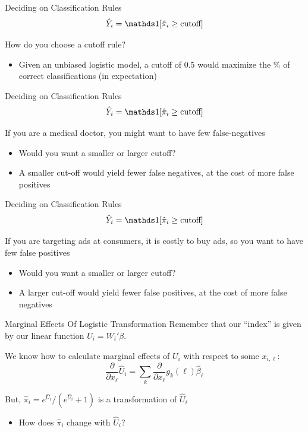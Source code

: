 \documentclass[aspectratio=169,t,11pt,table]{beamer}
\begin{document}
\begin{frame}{Deciding on Classification Rules}
  \vspace*{-\bigskipamount}
  $$\hat{Y}_i = \one{\hat{\pi}_i \geq \text{cutoff}}$$
  
  \bigskip
  How do you choose a cutoff rule?
  \begin{itemize}
    \item Given an unbiased logistic model, a cutoff of $0.5$ would maximize the \% of correct classifications (in expectation)
  \end{itemize}
\end{frame}

\begin{frame}{Deciding on Classification Rules}
  \vspace*{-\bigskipamount}
  $$\hat{Y}_i = \one{\hat{\pi}_i \geq \text{cutoff}}$$

  \bigskip
  If you are a medical doctor, you might want to have few false-negatives
  \begin{itemize}
    \item Would you want a smaller or larger cutoff?
    
    \pause
    \item A smaller cut-off would yield fewer false negatives, at the cost of more false positives
  \end{itemize}
\end{frame}

\begin{frame}{Deciding on Classification Rules}
  \vspace*{-\bigskipamount}
  $$\hat{Y}_i = \one{\hat{\pi}_i \geq \text{cutoff}}$$

  \bigskip
  If you are targeting ads at consumers, it is costly to buy ads, so you want to have few false positives
  \begin{itemize}
    \item Would you want a smaller or larger cutoff?
    
    \pause
    \item A larger cut-off would yield fewer false positives, at the cost of more false negatives
  \end{itemize}
\end{frame}

\begin{frame}{Marginal Effects Of Logistic Transformation}
  Remember that our ``index'' is given by our linear function $U_i = W_i' \beta$. 

  \bigskip
  We know how to calculate marginal effects of $U_i$ with respect to some $x_{i,\ell}$: 
  $$
    \frac{\partial}{\partial x_{\ell}} \hat{U}_i = \sum_k \frac{\partial}{\partial x_{\ell}} g_k(\ell) \hat{\beta}_\ell
  $$

  \pause
  \bigskip\bigskip
  But, $\hat{\pi}_i = e^{\hat{U}_i} / ( e^{\hat{U}_i} + 1 )$ is a transformation of $\hat{U}_i$
  \begin{itemize}
    \item How does $\hat{\pi}_i$ change with $\hat{U}_i$?
  \end{itemize}
\end{frame}
\end{document}
